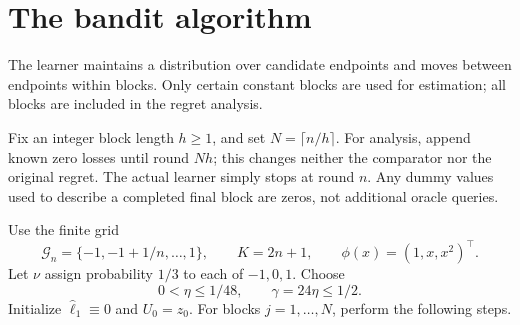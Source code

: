 \documentclass[11pt]{article}
\theoremstyle{definition}
\begin{document}
\section{The bandit algorithm}\label{sec:algorithm}

The learner maintains a distribution over candidate endpoints and moves between endpoints within blocks. Only certain constant blocks are used for estimation; all blocks are included in the regret analysis.

Fix an integer block length $h\geq1$, and set $N=\lceil n/h\rceil$. For analysis, append known zero losses until round $Nh$; this changes neither the comparator nor the original regret. The actual learner simply stops at round $n$. Any dummy values used to describe a completed final block are zeros, not additional oracle queries.

Use the finite grid
\[
 \mathcal G_n=\{-1,-1+1/n,\ldots,1\},\qquad K=2n+1,
 \qquad \phi(x)=(1,x,x^2)^\top.
\]
Let $\nu$ assign probability $1/3$ to each of $-1,0,1$. Choose
\begin{equation}\label{eq:eta}
 0<\eta\leq1/48,\qquad \gamma=24\eta\leq1/2.
\end{equation}
Initialize $\widehat\ell_1\equiv0$ and $U_0=z_0$. For blocks $j=1,\ldots,N$, perform the following steps.
\end{document}
